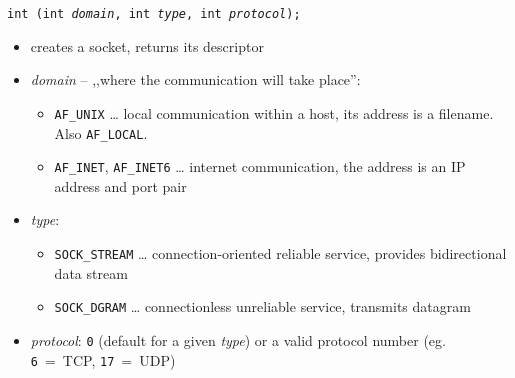 

\begin{slide}
\setlength{\baselineskip}{0.9\baselineskip}
\texttt{int (int \emph{domain}, int \emph{type},
int \emph{protocol});}
\begin{itemize}
\item creates a socket, returns its descriptor
\item \emph{domain} -- ,,where the communication will take place'': 
    \begin{itemize}
    \item \texttt{AF\_UNIX} \dots{} local communication within a host, its
    address is a filename.  Also \texttt{AF\_LOCAL}.
    \item \texttt{AF\_INET}, \texttt{AF\_INET6} \dots{} internet communication,
    the address is an IP address and port pair
    \end{itemize}
\item \emph{type}:
    \begin{itemize}
    \item \texttt{SOCK\_STREAM} \dots{} connection-oriented reliable service,
    provides bidirectional data stream
    \item \texttt{SOCK\_DGRAM} \dots{} connectionless unreliable service,
    transmits datagram
    \end{itemize}
\item \emph{protocol}: \texttt{0} (default for a given \emph{type})
or a valid protocol number (eg. \texttt{6}~=~TCP, \texttt{17}~=~UDP)
\end{itemize}
\end{slide}

\label{SOCKET}

